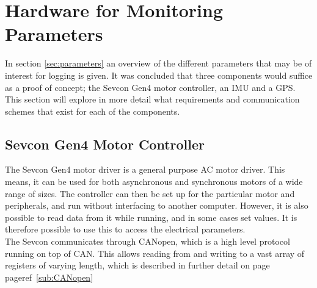 \section{Hardware for Monitoring Parameters}

\label{sec:hardware_for_par}
In section \ref{sec:parameters} an overview of the different parameters that may be of interest for logging is given.
It was concluded that three components would suffice as a proof of concept; the Sevcon Gen4 motor controller, an IMU and a GPS.
This section will explore in more detail what requirements and communication schemes that exist for each of the components.

\subsection{Sevcon Gen4 Motor Controller}
\label{sec:interfacin_with_sevcon}

The Sevcon Gen4 motor driver is a general purpose AC motor driver. 
This means, it can be used for both asynchronous and synchronous motors of a wide range of sizes.
The controller can then be set up for the particular motor and peripherals, and run without interfacing to another computer.
However, it is also possible to read data from it while running, and in some cases set values.
It is therefore possible to use this to access the electrical parameters. \\

The Sevcon communicates through CANopen, which is a high level protocol running on top of CAN.
This allows reading from and writing to a vast array of registers of varying length, which is described in further detail on page pageref~\ref{sub:CANopen}\\

